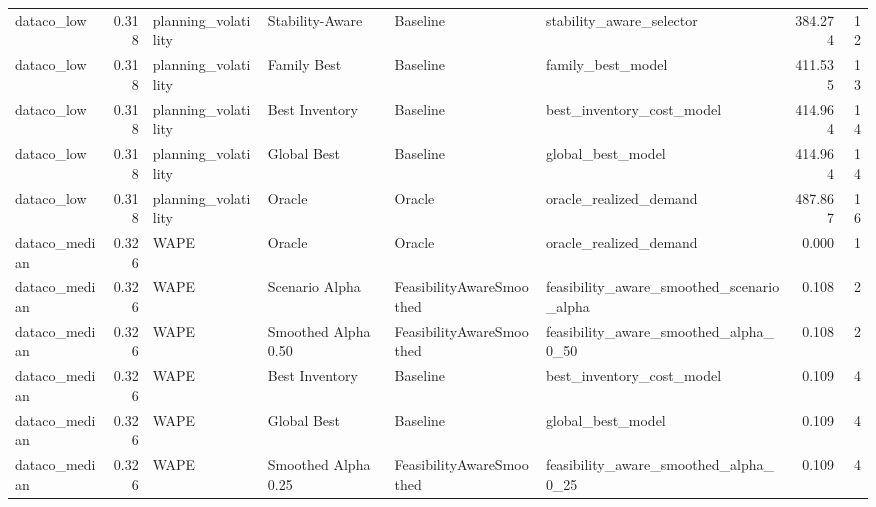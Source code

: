 \begin{table}
{\begin{tabular}{lrllllrr}
    dataco\_low &             0.318 &         planning\_volatility &       Stability-Aware &                  Baseline &                           stability\_aware\_selector &       384.274 &              12 \\
    dataco\_low &             0.318 &         planning\_volatility &           Family Best &                  Baseline &                                  family\_best\_model &       411.535 &              13 \\
    dataco\_low &             0.318 &         planning\_volatility &        Best Inventory &                  Baseline &                          best\_inventory\_cost\_model &       414.964 &              14 \\
    dataco\_low &             0.318 &         planning\_volatility &           Global Best &                  Baseline &                                  global\_best\_model &       414.964 &              14 \\
    dataco\_low &             0.318 &         planning\_volatility &                Oracle &                    Oracle &                             oracle\_realized\_demand &       487.867 &              16 \\
 dataco\_median &             0.326 &                        WAPE &                Oracle &                    Oracle &                             oracle\_realized\_demand &         0.000 &               1 \\
 dataco\_median &             0.326 &                        WAPE &        Scenario Alpha &  FeasibilityAwareSmoothed &          feasibility\_aware\_smoothed\_scenario\_alpha &         0.108 &               2 \\
 dataco\_median &             0.326 &                        WAPE &   Smoothed Alpha 0.50 &  FeasibilityAwareSmoothed &              feasibility\_aware\_smoothed\_alpha\_0\_50 &         0.108 &               2 \\
 dataco\_median &             0.326 &                        WAPE &        Best Inventory &                  Baseline &                          best\_inventory\_cost\_model &         0.109 &               4 \\
 dataco\_median &             0.326 &                        WAPE &           Global Best &                  Baseline &                                  global\_best\_model &         0.109 &               4 \\
 dataco\_median &             0.326 &                        WAPE &   Smoothed Alpha 0.25 &  FeasibilityAwareSmoothed &              feasibility\_aware\_smoothed\_alpha\_0\_25 &         0.109 &               4 \\

\end{tabular}}
\end{table}
